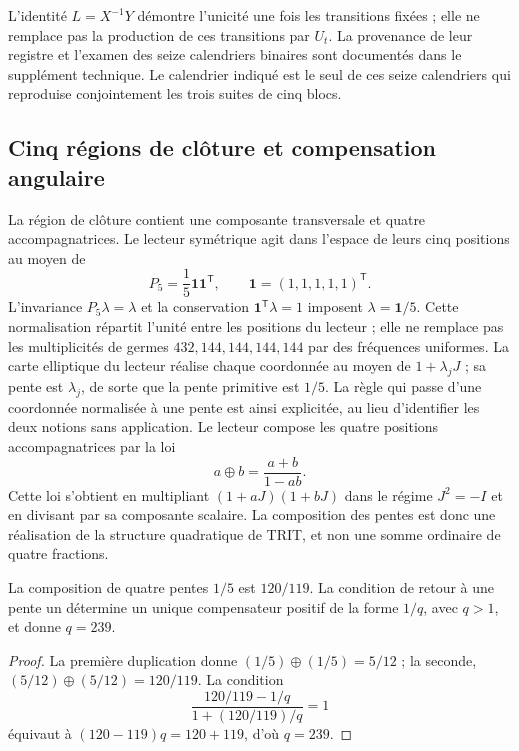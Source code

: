L'identité \(L=X^{-1}Y\) démontre l'unicité une fois les transitions fixées ; elle ne remplace pas la production de ces transitions par \(U_t\). La provenance de leur registre et l'examen des seize calendriers binaires sont documentés dans le supplément technique. Le calendrier indiqué est le seul de ces seize calendriers qui reproduise conjointement les trois suites de cinq blocs.

\subsection{Cinq régions de clôture et compensation angulaire}

La région de clôture contient une composante transversale et quatre accompagnatrices. Le lecteur symétrique agit dans l'espace de leurs cinq positions au moyen de
\[
 P_5=\frac15\mathbf1\mathbf1^{\mathsf T},\qquad
 \mathbf1=(1,1,1,1,1)^{\mathsf T}.
\]
L'invariance \(P_5\lambda=\lambda\) et la conservation \(\mathbf1^{\mathsf T}\lambda=1\) imposent \(\lambda=\mathbf1/5\). Cette normalisation répartit l'unité entre les positions du lecteur ; elle ne remplace pas les multiplicités de germes \(432,144,144,144,144\) par des fréquences uniformes. La carte elliptique du lecteur réalise chaque coordonnée au moyen de \(1+\lambda_jJ\) ; sa pente est \(\lambda_j\), de sorte que la pente primitive est \(1/5\). La règle qui passe d'une coordonnée normalisée à une pente est ainsi explicitée, au lieu d'identifier les deux notions sans application. Le lecteur compose les quatre positions accompagnatrices par la loi
\begin{equation}
 a\oplus b=\frac{a+b}{1-ab}.
 \label{x_reciprocidad:eq:suma-pendientes}
\end{equation}
Cette loi s'obtient en multipliant \((1+aJ)(1+bJ)\) dans le régime \(J^2=-I\) et en divisant par sa composante scalaire. La composition des pentes est donc une réalisation de la structure quadratique de TRIT, et non une somme ordinaire de quatre fractions.

\begin{proposition}
La composition de quatre pentes \(1/5\) est \(120/119\). La condition de retour à une pente un détermine un unique compensateur positif de la forme \(1/q\), avec \(q>1\), et donne \(q=239\).
\end{proposition}
\begin{proof}
La première duplication donne \((1/5)\oplus(1/5)=5/12\) ; la seconde, \((5/12)\oplus(5/12)=120/119\). La condition
\[
 \frac{120/119-1/q}{1+(120/119)/q}=1
\]
équivaut à \((120-119)q=120+119\), d'où \(q=239\).
\end{proof}

